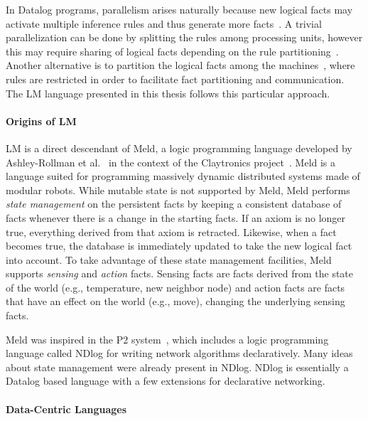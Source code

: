 In Datalog programs, parallelism arises naturally because new logical facts may
activate multiple inference rules and thus generate more
facts~\cite{Ganguly:1990:FPP:93597.98724,Seib:1991:PDP:113413.113435,Wolfson:1988:DPL:971701.50242}.
A trivial parallelization can be done by splitting the rules among processing
units, however this may require sharing of logical facts depending on the rule
partitioning~\cite{Wolfson:1988:DPL:971701.50242}. Another alternative is to
partition the logical facts among the
machines~\cite{183073,Loo-condie-garofalakis-p2}, where rules are restricted in
order to facilitate fact partitioning and communication. The LM language
presented in this thesis follows this particular approach.

\paragraph{Origins of LM}

LM is a direct descendant of Meld, a logic programming language developed by
Ashley-Rollman et
al.~\cite{ashley-rollman-iclp09,ashley-rollman-derosa-iros07wksp} in the context
of the Claytronics project~\cite{goldstein-computer05}. Meld is a language
suited for programming massively dynamic distributed systems made of modular
robots. While mutable state is not supported by Meld, Meld performs \emph{state
management} on the persistent facts by keeping a consistent database of facts
whenever there is a change in the starting facts. If an axiom is no longer true,
everything derived from that axiom is retracted. Likewise, when a fact becomes
true, the database is immediately updated to take the new logical fact into
account. To take advantage of these state management facilities, Meld supports
\emph{sensing} and \emph{action} facts. Sensing facts are facts derived from the
state of the world (e.g., temperature, new neighbor node) and action facts are
facts that have an effect on the world (e.g., move), changing the underlying
sensing facts.

Meld was inspired in the P2 system~\cite{Loo-condie-garofalakis-p2}, which
includes a logic programming language called NDlog for writing network
algorithms declaratively. Many ideas about state management were already present
in NDlog.  NDlog is essentially a Datalog based language with a few extensions
for declarative networking.

\paragraph{Data-Centric Languages}

